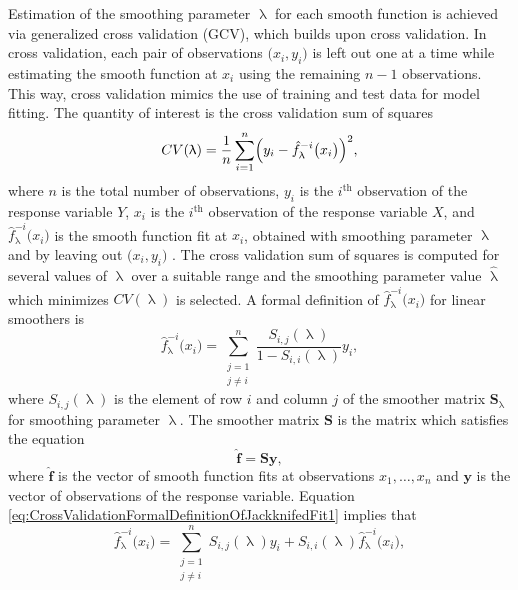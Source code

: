 Estimation of the smoothing parameter \(\uplambda\) for each smooth function is achieved via generalized cross validation (GCV), which builds upon cross validation.  In cross validation, each pair of observations \(\bigl(x_i, y_i\bigr)\) is left out one at a time while estimating the smooth function at \(x_i\) using the remaining \(n - 1\) observations.  This way, cross validation mimics the use of training and test data for model fitting.  The quantity of interest is the cross validation sum of squares
\begin{equation}
  \label{eq:CrossValidationSumOfSquares01}
  CV(\uplambda) = \frac{1}{n} \sum_{i = 1}^n\Bigl(y_i - \hat{f}_\uplambda^{-i}\bigl(x_i\bigr)\Bigr)^2,
\end{equation}
where \(n\) is the total number of observations, \(y_i\) is the \(i^{\text{th}}\) observation of the response variable \(Y\), \(x_i\) is the \(i^{\text{th}}\) observation of the response variable \(X\), and \(\hat{f}_\uplambda^{-i}\bigl(x_i\bigr)\) is the smooth function fit at \(x_i\), obtained with smoothing parameter \(\uplambda\) and by leaving out \(\bigl(x_i, y_i\bigr)\) \parencite{Hastie1991}.  The cross validation sum of squares is computed for several values of \(\uplambda\) over a suitable range and the smoothing parameter value \(\hat{\uplambda}\) which minimizes \(CV(\uplambda)\) is selected.  A formal definition of \(\hat{f}_\uplambda^{-i}\bigl(x_i\bigr)\) for linear smoothers is
\begin{equation}
  \label{eq:CrossValidationFormalDefinitionOfJackknifedFit1}
  \hat{f}_\uplambda^{-i}\bigl(x_i\bigr) = \sum_{\substack{j = 1 \\ j \not = i}}^n \frac{S_{i, j}(\uplambda)}{1 - S_{i, i}(\uplambda)} y_i,
\end{equation}
where \(S_{i, j}(\uplambda)\) is the element of row \(i\) and column \(j\) of the smoother matrix \(\symbf{S}_\uplambda\) for smoothing parameter \(\uplambda\).  The smoother matrix \(\symbf{S}\) is the matrix which satisfies the equation
\begin{equation}
  \label{eq:SmootherMatrixDefinition}
  \hat{\symbf{f}} = \symbf{S} \symbf{y},
\end{equation}
where \(\hat{\symbf{f}}\) is the vector of smooth function fits at observations \(x_1, \ldots, x_n\) and \(\symbf{y}\) is the vector of observations of the response variable.
Equation \ref{eq:CrossValidationFormalDefinitionOfJackknifedFit1} implies that
\begin{equation}
  \label{eq:CrossValidationFormalDefinitionOfJackknifedFit2}
  \hat{f}_\uplambda^{-i}\bigl(x_i\bigr) = \sum_{\substack{j = 1 \\ j \not = i}}^n S_{i, j}(\uplambda) y_i +S_{i, i}(\uplambda) \hat{f}_\uplambda^{-i}\bigl(x_i\bigr),
\end{equation}
